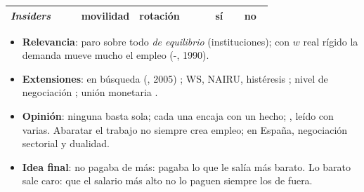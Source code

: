 \documentclass{article}
\begin{document}
\begin{columnas}
{\begin{tabular}{@{}>{\raggedright\arraybackslash}p{0.27\linewidth}>{\raggedright\arraybackslash}p{0.2\linewidth}>{\raggedright\arraybackslash}p{0.27\linewidth}cc@{}}
\emph{Insiders} & movilidad & rotación & \textcolor{tceerojo}{sí} & \textcolor{tceerojo}{no}\\
\bottomrule
\end{tabular}\par}
\begin{itemize}
\item \textbf{Relevancia}: paro sobre todo \emph{de equilibrio} (instituciones); con $w$ real rígido la demanda mueve mucho el empleo (-, 1990).
\item \textbf{Extensiones}:  en búsqueda (, 2005) ; WS, NAIRU, histéresis ; nivel de negociación ; unión monetaria .
\item \textbf{Opinión}: ninguna basta sola; cada una encaja con un hecho; , leído con varias. Abaratar el trabajo no siempre crea empleo; en España, negociación sectorial y dualidad.
\item \textbf{Idea final}:  no pagaba de más: pagaba lo que le salía más barato. Lo barato sale caro: que el salario más alto no lo paguen siempre los de fuera.
\end{itemize}


\end{columnas}
\end{document}
